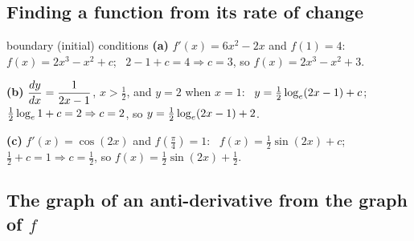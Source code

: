 \subsection{Finding a function from its rate of change}
\label{sec:bc}

\begin{example}{boundary (initial) conditions \byhand}
\textbf{(a)} $f'(x)=6x^2-2x$ and $f(1)=4$: \ $f(x)=2x^3-x^2+c$; \ $2-1+c=4\Rightarrow c=3$, so $f(x)=2x^3-x^2+3$.\par
\textbf{(b)} $\dfrac{dy}{dx}=\dfrac{1}{2x-1}$, $x>\frac12$, and $y=2$ when $x=1$: \ $y=\frac12\log_e(2x-1)+c$; \ $\frac12\log_e1+c=2\Rightarrow c=2$, so $y=\frac12\log_e(2x-1)+2$.\par
\textbf{(c)} $f'(x)=\cos(2x)$ and $f\!\left(\frac{\pi}{4}\right)=1$: \ $f(x)=\frac12\sin(2x)+c$; \ $\frac12+c=1\Rightarrow c=\frac12$, so $f(x)=\frac12\sin(2x)+\frac12$.
\end{example}

\subsection{The graph of an anti-derivative from the graph of $f$}
\label{sec:antigraph}

